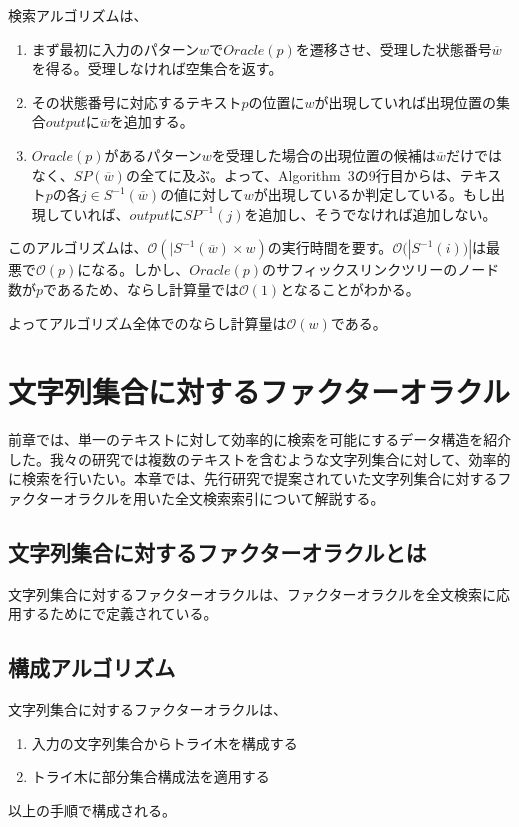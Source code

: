 \documentclass[11pt,a4paper]{jreport}
\begin{document}
  検索アルゴリズムは、
  \begin{enumerate}
    \item まず最初に入力のパターン$w$で$Oracle(p)$を遷移させ、受理した状態番号$\overline{w}$を得る。受理しなければ空集合を返す。
    \item その状態番号に対応するテキスト$p$の位置に$w$が出現していれば出現位置の集合$output$に$\overline{w}$を追加する。
    \item $Oracle(p)$があるパターン$w$を受理した場合の出現位置の候補は$\overline{w}$だけではなく、$SP(\overline{w})$の全てに及ぶ。よって、Algorithm\ 3の9行目からは、テキスト$p$の各$j \in S^{-1}(\overline{w})$の値に対して$w$が出現しているか判定している。もし出現していれば、$outputにSP^{-1}(j)$を追加し、そうでなければ追加しない。
  \end{enumerate}

  このアルゴリズムは、$\mathcal{O}(|S^{-1}(\overline{w}) \times w)$の実行時間を要す。$\mathcal{O}(|S^{-1}(i))|$は最悪で$\mathcal{O}(p)$になる。しかし、$Oracle(p)$のサフィックスリンクツリーのノード数が$p$であるため、ならし計算量では$\mathcal{O}(1)$となることがわかる。

  よってアルゴリズム全体でのならし計算量は$\mathcal{O}(w)$である。

  \chapter{文字列集合に対するファクターオラクル}
  前章では、単一のテキストに対して効率的に検索を可能にするデータ構造を紹介した。我々の研究では複数のテキストを含むような文字列集合に対して、効率的に検索を行いたい。本章では、先行研究\cite{ohi}で提案されていた文字列集合に対するファクターオラクルを用いた全文検索索引について解説する。

  \section{文字列集合に対するファクターオラクルとは}
  文字列集合に対するファクターオラクルは、ファクターオラクルを全文検索に応用するために\cite{ohi}で定義されている。

  \section{構成アルゴリズム}
  文字列集合に対するファクターオラクルは、
  \begin{enumerate}
    \item 入力の文字列集合からトライ木を構成する
    \item トライ木に部分集合構成法を適用する
  \end{enumerate}
  以上の手順で構成される。
\end{document}
